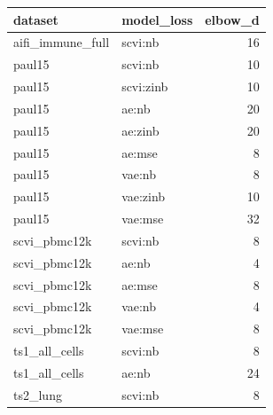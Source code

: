 \begin{tabular}{llr}
\toprule
dataset & model\_loss & elbow\_d \\
\midrule
aifi\_immune\_full & scvi:nb & 16 \\
paul15 & scvi:nb & 10 \\
paul15 & scvi:zinb & 10 \\
paul15 & ae:nb & 20 \\
paul15 & ae:zinb & 20 \\
paul15 & ae:mse & 8 \\
paul15 & vae:nb & 8 \\
paul15 & vae:zinb & 10 \\
paul15 & vae:mse & 32 \\
scvi\_pbmc12k & scvi:nb & 8 \\
scvi\_pbmc12k & ae:nb & 4 \\
scvi\_pbmc12k & ae:mse & 8 \\
scvi\_pbmc12k & vae:nb & 4 \\
scvi\_pbmc12k & vae:mse & 8 \\
ts1\_all\_cells & scvi:nb & 8 \\
ts1\_all\_cells & ae:nb & 24 \\
ts2\_lung & scvi:nb & 8 \\
\bottomrule
\end{tabular}
